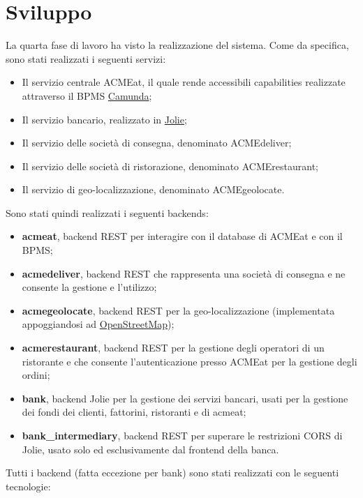 \documentclass[11pt]{article} %
\begin{document}
\clearpage

\section{Sviluppo}
\label{sez:sviluppo}

La quarta fase di lavoro ha visto la realizzazione del sistema. Come da specifica, sono stati realizzati i seguenti servizi:
\begin{itemize}
\item Il servizio centrale ACMEat, il quale rende accessibili capabilities realizzate attraverso il BPMS \href{https://camunda.com/}{Camunda};
\item Il servizio bancario, realizzato in \href{https://www.jolie-lang.org/}{Jolie};
\item Il servizio delle società di consegna, denominato ACMEdeliver;
\item Il servizio delle società di ristorazione, denominato ACMErestaurant;
\item Il servizio di geo-localizzazione, denominato ACMEgeolocate.
\end{itemize}
Sono stati quindi realizzati i seguenti backends:
\begin{itemize}
\item \textbf{acmeat}, backend REST per interagire con il database di ACMEat e con il BPMS;
\item \textbf{acmedeliver}, backend REST che rappresenta una società di consegna e ne consente la gestione e l'utilizzo;
\item \textbf{acmegeolocate}, backend REST per la geo-localizzazione (implementata appoggiandosi ad \href{https://www.openstreetmap.org/#map=6/42.088/12.564}{OpenStreetMap});
\item \textbf{acmerestaurant}, backend REST per la gestione degli operatori di un ristorante e che consente l'autenticazione presso ACMEat per la gestione degli ordini;
\item \textbf{bank}, backend Jolie per la gestione dei servizi bancari, usati per la gestione dei fondi dei clienti, fattorini, ristoranti e di acmeat;
\item \textbf{bank\_intermediary}, backend REST per superare le restrizioni CORS di Jolie, usato solo ed esclusivamente dal frontend della banca.
\end{itemize}
Tutti i backend (fatta eccezione per bank) sono stati realizzati con le seguenti tecnologie:
\end{document}
